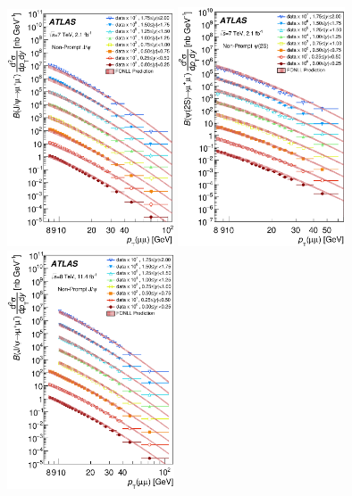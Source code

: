\begin{description}[style=unboxed,leftmargin=0cm]
\begin{figure} [!ht]
  \begin{center} 
    \includegraphics[width=0.44\textwidth]{figures/ct_7TeV_JpsiNP_xSec.eps}
    \includegraphics[width=0.44\textwidth]{figures/ct_7TeV_Psi2SNP_xSec.eps}\hfil
    \includegraphics[width=0.44\textwidth]{figures/ct_8TeV_JpsiNP_xSec.eps}

\end{center}
\end{figure}
\end{description}
